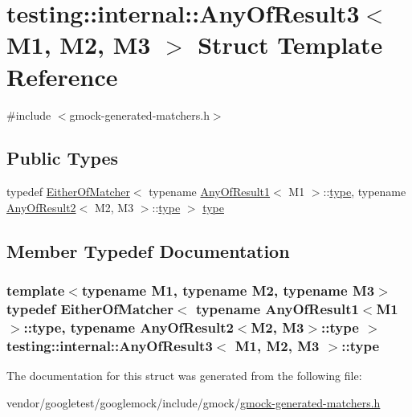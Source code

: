 \hypertarget{structtesting_1_1internal_1_1AnyOfResult3}{}\section{testing\+:\+:internal\+:\+:Any\+Of\+Result3$<$ M1, M2, M3 $>$ Struct Template Reference}
\label{structtesting_1_1internal_1_1AnyOfResult3}


{\ttfamily \#include $<$gmock-\/generated-\/matchers.\+h$>$}

\subsection*{Public Types}
\begin{DoxyCompactItemize}
\item 
typedef \hyperlink{classtesting_1_1internal_1_1EitherOfMatcher}{Either\+Of\+Matcher}$<$ typename \hyperlink{structtesting_1_1internal_1_1AnyOfResult1}{Any\+Of\+Result1}$<$ M1 $>$\+::\hyperlink{structtesting_1_1internal_1_1AnyOfResult3_a232b20553cc0a33a6741e85e19ef4b0c}{type}, typename \hyperlink{structtesting_1_1internal_1_1AnyOfResult2}{Any\+Of\+Result2}$<$ M2, M3 $>$\+::\hyperlink{structtesting_1_1internal_1_1AnyOfResult3_a232b20553cc0a33a6741e85e19ef4b0c}{type} $>$ \hyperlink{structtesting_1_1internal_1_1AnyOfResult3_a232b20553cc0a33a6741e85e19ef4b0c}{type}
\end{DoxyCompactItemize}


\subsection{Member Typedef Documentation}
\subsubsection[{\texorpdfstring{type}{type}}]{\setlength{\rightskip}{0pt plus 5cm}template$<$typename M1, typename M2, typename M3$>$ typedef {\bf Either\+Of\+Matcher}$<$ typename {\bf Any\+Of\+Result1}$<$M1$>$\+::{\bf type}, typename {\bf Any\+Of\+Result2}$<$M2, M3$>$\+::{\bf type} $>$ {\bf testing\+::internal\+::\+Any\+Of\+Result3}$<$ M1, M2, M3 $>$\+::{\bf type}}\hypertarget{structtesting_1_1internal_1_1AnyOfResult3_a232b20553cc0a33a6741e85e19ef4b0c}{}\label{structtesting_1_1internal_1_1AnyOfResult3_a232b20553cc0a33a6741e85e19ef4b0c}


The documentation for this struct was generated from the following file\+:\begin{DoxyCompactItemize}
\item 
vendor/googletest/googlemock/include/gmock/\hyperlink{gmock-generated-matchers_8h}{gmock-\/generated-\/matchers.\+h}\end{DoxyCompactItemize}

